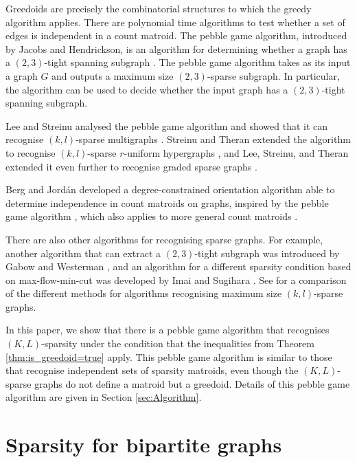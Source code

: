 \documentclass{article}
\begin{document}
Greedoids are precisely the combinatorial structures to which the greedy algorithm applies.  There are polynomial time algorithms to test whether a set of edges is independent in a count matroid. The pebble game algorithm, introduced by Jacobs and Hendrickson, is an algorithm for determining whether a graph has a $(2,3)$-tight spanning subgraph \cite{Pebble_original}. The pebble game algorithm takes as its input a graph $G$ and outputs a maximum size $(2,3)$-sparse subgraph. In particular, the algorithm can be used to decide whether the input graph has a $(2,3)$-tight spanning subgraph. 

Lee and Streinu analysed the pebble game algorithm and showed that it can recognise $(k,l)$-sparse multigraphs \cite{LEE20081425}. Streinu and Theran extended the algorithm to recognise $(k,l)$-sparse $r$-uniform hypergraphs \cite{STREINU20091944}, and Lee, Streinu, and Theran extended it even further to recognise graded sparse graphs \cite{lee2007graded}. 

Berg and Jord\'an developed a degree-constrained orientation algorithm able to determine independence in count matroids on graphs, inspired by the pebble game algorithm \cite{Berg-Jordan}, which also applies to more general count matroids \cite[Section 13.5]{Frank2012}. 

There are also other algorithms for recognising sparse graphs. For example, another algorithm that can extract a $(2,3)$-tight subgraph was introduced by Gabow and Westerman \cite{Gabow-Westerman}, and an algorithm for a different sparsity condition based on max-flow-min-cut was developed by Imai and Sugihara \cite{IMAI198579}. See \cite{madarasi2025efficient} for a comparison of the different methods for algorithms recognising maximum size $(k,l)$-sparse graphs. 

In this paper, we show that there is a pebble game algorithm that recognises $(K,L)$-sparsity under the condition that the inequalities from Theorem \ref{thm:is_greedoid=true} apply. This pebble game algorithm is similar to those that recognise independent sets of sparsity matroids, even though the $(K,L)$-sparse graphs do not define a matroid but a greedoid. Details of this pebble game algorithm are given in Section \ref{sec:Algorithm}.


\section{Sparsity for bipartite graphs}\label{sec:sparsityrk2}
\end{document}
